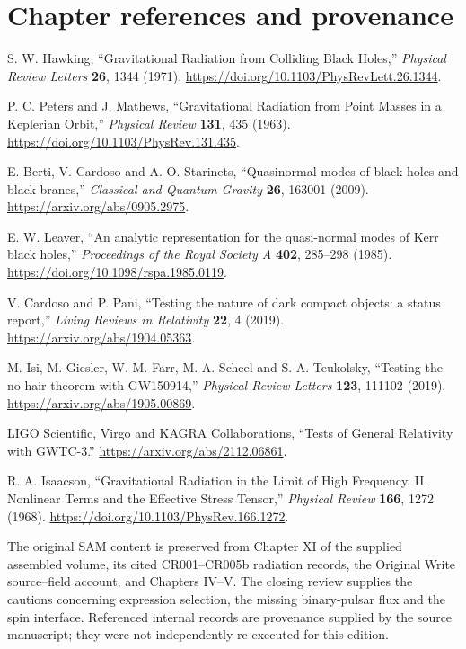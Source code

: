 \section*{Chapter references and provenance}
\begin{enumerate}[label={\textnormal{[XI.\arabic*]}}]
\item S. W. Hawking, ``Gravitational Radiation from Colliding Black Holes,'' \emph{Physical Review Letters} \textbf{26}, 1344 (1971). \url{https://doi.org/10.1103/PhysRevLett.26.1344}.
\item P. C. Peters and J. Mathews, ``Gravitational Radiation from Point Masses in a Keplerian Orbit,'' \emph{Physical Review} \textbf{131}, 435 (1963). \url{https://doi.org/10.1103/PhysRev.131.435}.
\item E. Berti, V. Cardoso and A. O. Starinets, ``Quasinormal modes of black holes and black branes,'' \emph{Classical and Quantum Gravity} \textbf{26}, 163001 (2009). \url{https://arxiv.org/abs/0905.2975}.
\item E. W. Leaver, ``An analytic representation for the quasi-normal modes of Kerr black holes,'' \emph{Proceedings of the Royal Society A} \textbf{402}, 285--298 (1985). \url{https://doi.org/10.1098/rspa.1985.0119}.
\item V. Cardoso and P. Pani, ``Testing the nature of dark compact objects: a status report,'' \emph{Living Reviews in Relativity} \textbf{22}, 4 (2019). \url{https://arxiv.org/abs/1904.05363}.
\item M. Isi, M. Giesler, W. M. Farr, M. A. Scheel and S. A. Teukolsky, ``Testing the no-hair theorem with GW150914,'' \emph{Physical Review Letters} \textbf{123}, 111102 (2019). \url{https://arxiv.org/abs/1905.00869}.
\item LIGO Scientific, Virgo and KAGRA Collaborations, ``Tests of General Relativity with GWTC-3.'' \url{https://arxiv.org/abs/2112.06861}.
\item R. A. Isaacson, ``Gravitational Radiation in the Limit of High Frequency. II. Nonlinear Terms and the Effective Stress Tensor,'' \emph{Physical Review} \textbf{166}, 1272 (1968). \url{https://doi.org/10.1103/PhysRev.166.1272}.
\end{enumerate}
The original SAM content is preserved from Chapter XI of the supplied assembled volume, its cited CR001--CR005b radiation records, the Original Write source--field account, and Chapters IV--V. The closing review supplies the cautions concerning expression selection, the missing binary-pulsar flux and the spin interface. Referenced internal records are provenance supplied by the source manuscript; they were not independently re-executed for this edition.
